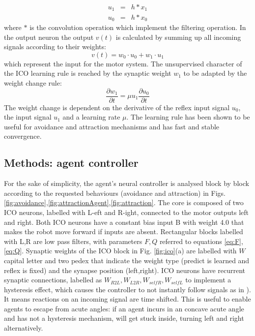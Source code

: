 \setlength{\arraycolsep}{0.0em}
\begin{eqnarray}
u_1 &=& h \ast x_1 \\
u_0 &=& h \ast x_0
\end{eqnarray}
\setlength{\arraycolsep}{5pt}
where $\ast$ is the convolution operation which implement the filtering operation.
In the output neuron the output $v(t)$ is calculated by
summing up all incoming signals according to their weights:
\begin{equation}
v(t)=w_{0}\cdot u_{0}+w_{1}\cdot u_{1}
\end{equation}
which represent the input for the motor system.
The unsupervised character of the ICO learning rule is reached by
the synaptic weight $w_{1}$ to be adapted by the weight
change rule:
\begin{equation}
\frac{\partial w_{1}}{\partial t}=\mu u_{1} \frac{\partial u_{0}}{\partial t}
\end{equation}
The weight change is dependent on the derivative of the reflex input
signal $u_{0}$, the input signal $u_{1}$ and a
learning rate $\mu$. The
learning rule has been shown to be useful for avoidance and attraction
mechanisms and has fast and stable convergence.


\subsection{Methods: agent controller}
For the sake of simplicity, the agent's neural controller is analysed block
by block according to the requested behaviours (avoidance and attraction)
in Figs. \ref{fig:avoidance},\ref{fig:attractionAgent},\ref{fig:attraction}.
The core is composed of two ICO neurons, labelled with L-eft and R-ight,
connected to the motor outputs left and right. Both ICO neurons have a
constant bias input B with weight 4.0 that makes the robot move forward
if inputs are absent. Rectangular blocks labelled with L,R are low pass
filters, with parameters $F,Q$ referred to equations \ref{eq:F},\ref{eq:Q}.
Synaptic weights of the ICO block in Fig. \ref{fig:ico}(a) are labelled with
$W$ capital letter and two pedex that indicate the weight type
(predict is learned and reflex is fixed) and the synapse position (left,right).
ICO neurons have recurrent synaptic connections, labelled as
$W_{R2L},W_{L2R},W_{selfR},W_{selfL}$ to implement a hysteresis effect,
which causes the controller to not instantly follow signals as in \citet{Hulse2004,Paseman2002}).
It means reactions on an incoming signal are time shifted. This is useful to enable agents to escape from acute angles: if
an agent incurs in an concave acute angle and has not a hysteresis mechanism,
will get stuck inside, turning left and right alternatively.

